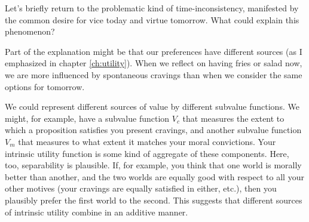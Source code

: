 Let's briefly return to the problematic kind of time-inconsistency, manifested
by the common desire for vice today and virtue tomorrow. What could explain this phenomenon?

Part of the explanation might be that our preferences have different sources (as
I emphasized in chapter \ref{ch:utility}). When we reflect on having fries or
salad now, we are more influenced by spontaneous cravings than when we consider
the same options for tomorrow.

We could represent different sources of value by different subvalue functions.
We might, for example, have a subvalue function $V_{c}$ that measures the extent
to which a proposition satisfies you present cravings, and another subvalue
function $V_{m}$ that measures to what extent it matches your moral convictions.
Your intrinsic utility function is some kind of aggregate of these components.
Here, too, separability is plausible. If, for example, you think that one world
is morally better than another, and the two worlds are equally good with respect
to all your other motives (your cravings are equally satisfied in either, etc.),
then you plausibly prefer the first world to the second. This suggests that
different sources of intrinsic utility combine in an additive manner.


